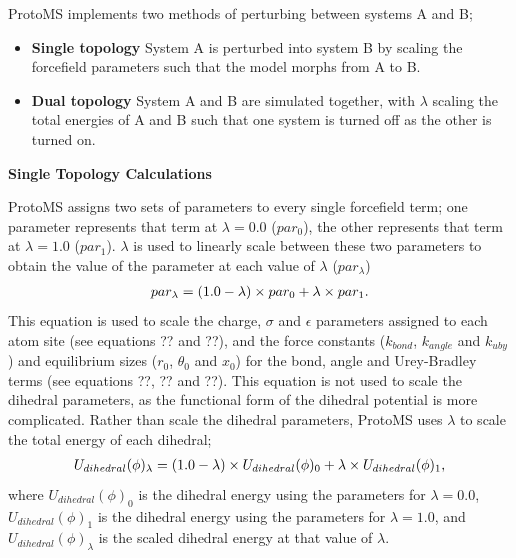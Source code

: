 \documentclass[letterpaper,10pt,english]{sphinxmanual}
\begin{document}
ProtoMS implements two methods of perturbing between systems A and B;
\begin{itemize}
\item {} 
\textbf{Single topology} System A is perturbed into system B by scaling the forcefield parameters such that the model morphs from A to B.

\item {} 
\textbf{Dual topology} System A and B are simulated together, with \(\lambda\) scaling the total energies of A and B such that one system is turned off as the other is turned on.

\end{itemize}

\textbf{Single Topology Calculations}

ProtoMS assigns two sets of parameters to every single forcefield term; one parameter represents that term at \(\lambda=0.0\) (\(par_0\)), the other represents that term at \(\lambda=1.0\) (\(par_1\)). \(\lambda\) is used to linearly scale between these two parameters to obtain the value of the parameter at each value of \(\lambda\) (\(par_\lambda\))
\begin{gather}
\begin{split}par_\lambda = (1.0-\lambda) \times par_0 + \lambda \times par_1.\end{split}\notag
\end{gather}
This equation is used to scale the charge, \(\sigma\) and \(\epsilon\) parameters assigned to each atom site (see equations ?? and ??), and the force constants (\(k_{bond}\), \(k_{angle}\) and \(k_{uby}\)) and equilibrium sizes (\(r_0\), \(\theta_0\) and \(x_0\)) for the bond, angle and Urey-Bradley terms (see equations ??, ?? and ??). This equation is not used to scale the dihedral parameters, as the functional form of the dihedral potential is more complicated. Rather than scale the dihedral parameters, ProtoMS uses \(\lambda\) to scale the total energy of each dihedral;
\begin{gather}
\begin{split}U_{dihedral}(\phi)_\lambda = (1.0-\lambda)\times U_{dihedral}(\phi)_0 + \lambda \times U_{dihedral}(\phi)_1,\end{split}\notag
\end{gather}
where \(U_{dihedral}(\phi)_0\) is the dihedral energy using the parameters for \(\lambda=0.0\), \(U_{dihedral}(\phi)_1\) is the dihedral energy using the parameters for \(\lambda=1.0\), and \(U_{dihedral}(\phi)_\lambda\) is the scaled dihedral energy at that value of \(\lambda\).
\end{document}

